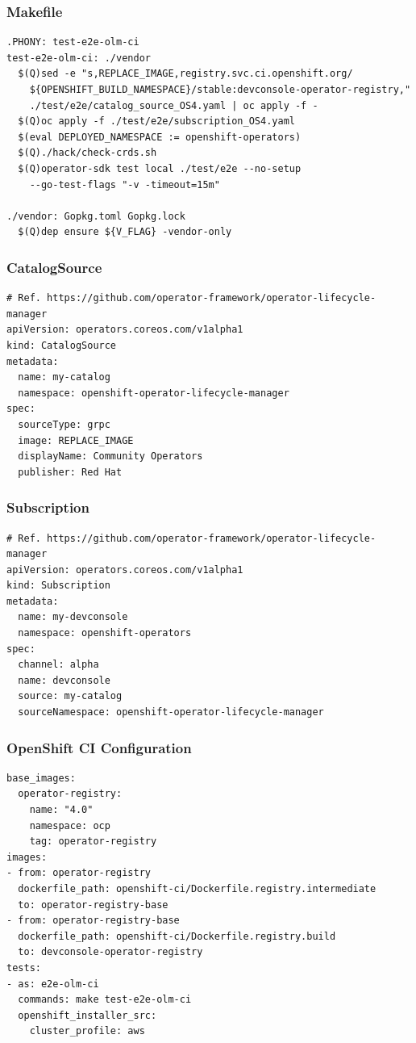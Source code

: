 \documentclass[aspectratio=169]{beamer}
\begin{document}
\begin{frame}[fragile]
  \frametitle{Makefile}

  \begin{Verbatim}[fontsize=\small]
.PHONY: test-e2e-olm-ci
test-e2e-olm-ci: ./vendor
  $(Q)sed -e "s,REPLACE_IMAGE,registry.svc.ci.openshift.org/
    ${OPENSHIFT_BUILD_NAMESPACE}/stable:devconsole-operator-registry,"
    ./test/e2e/catalog_source_OS4.yaml | oc apply -f -
  $(Q)oc apply -f ./test/e2e/subscription_OS4.yaml
  $(eval DEPLOYED_NAMESPACE := openshift-operators)
  $(Q)./hack/check-crds.sh
  $(Q)operator-sdk test local ./test/e2e --no-setup
    --go-test-flags "-v -timeout=15m"

./vendor: Gopkg.toml Gopkg.lock
  $(Q)dep ensure ${V_FLAG} -vendor-only
  \end{Verbatim}
\end{frame}

\begin{frame}[fragile]
  \frametitle{CatalogSource}

  \begin{Verbatim}[fontsize=\small]
# Ref. https://github.com/operator-framework/operator-lifecycle-manager
apiVersion: operators.coreos.com/v1alpha1
kind: CatalogSource
metadata:
  name: my-catalog
  namespace: openshift-operator-lifecycle-manager
spec:
  sourceType: grpc
  image: REPLACE_IMAGE
  displayName: Community Operators
  publisher: Red Hat
  \end{Verbatim}
\end{frame}

\begin{frame}[fragile]
  \frametitle{Subscription}

  \begin{Verbatim}[fontsize=\small]
# Ref. https://github.com/operator-framework/operator-lifecycle-manager
apiVersion: operators.coreos.com/v1alpha1
kind: Subscription
metadata:
  name: my-devconsole
  namespace: openshift-operators
spec:
  channel: alpha
  name: devconsole
  source: my-catalog
  sourceNamespace: openshift-operator-lifecycle-manager
  \end{Verbatim}
\end{frame}

\begin{frame}[fragile]
  \frametitle{OpenShift CI Configuration}

  \begin{Verbatim}[fontsize=\small]
base_images:
  operator-registry:
    name: "4.0"
    namespace: ocp
    tag: operator-registry
images:
- from: operator-registry
  dockerfile_path: openshift-ci/Dockerfile.registry.intermediate
  to: operator-registry-base
- from: operator-registry-base
  dockerfile_path: openshift-ci/Dockerfile.registry.build
  to: devconsole-operator-registry
tests:
- as: e2e-olm-ci
  commands: make test-e2e-olm-ci
  openshift_installer_src:
    cluster_profile: aws
  \end{Verbatim}
\end{frame}
\end{document}
